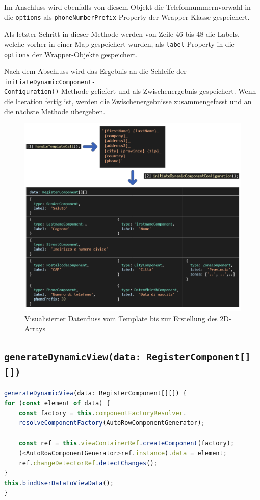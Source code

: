 Im Anschluss wird ebenfalls von diesem Objekt die Telefonnummernvorwahl in die \texttt{options} als \texttt{phoneNumberPrefix}-Property der Wrapper-Klasse gespeichert.

Als letzter Schritt in dieser Methode werden von Zeile 46 bis 48 die Labels, welche vorher in einer Map gespeichert wurden, als \texttt{label}-Property in die \texttt{options} der Wrapper-Objekte gespeichert. 

Nach dem Abschluss wird das Ergebnis an die Schleife der \texttt{initiateDynamicComponent-\\Configuration()}-Methode geliefert und als Zwischenergebnis gespeichert. Wenn die Iteration fertig ist, werden die Zwischenergebnisse zusammengefasst und an die nächste Methode übergeben.

\begin{figure}[H]
	\centerline{
		\includegraphics[width=1\textwidth, frame]{./grafiken/RF_Visualisierter Ablauf_1.png}
	}
	\vskip0pt
	\caption{Visualisierter Datenfluss vom Template bis zur Erstellung des 2D-Arrays}
\end{figure}

\subsection{\texttt{generateDynamicView(data: RegisterComponent[][])}}

\begin{lstlisting}[caption={Die \texttt{generateDynamicView()}-Methode}, language=JavaScript,label={lst:generateDynamicView}]
generateDynamicView(data: RegisterComponent[][]) {
for (const element of data) {
	const factory = this.componentFactoryResolver.
	resolveComponentFactory(AutoRowComponentGenerator);
	
	const ref = this.viewContainerRef.createComponent(factory);
	(<AutoRowComponentGenerator>ref.instance).data = element;
	ref.changeDetectorRef.detectChanges();
}
this.bindUserDataToViewData();
}
\end{lstlisting}


